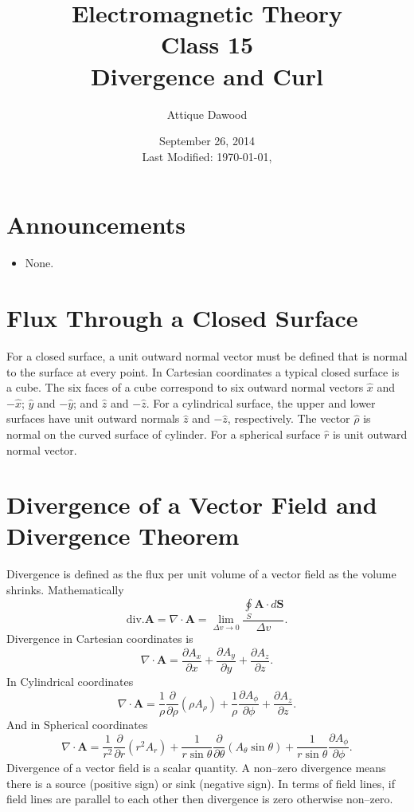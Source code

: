 \documentclass[12pt,a4paper]{article}
\title{Electromagnetic Theory\\Class 15\\Divergence and Curl}
\author{Attique Dawood}
\date{September 26, 2014\\[0.2cm] Last Modified: \today, \currenttime}
\begin{document}
\maketitle
\section{Announcements}
\begin{itemize}
\item None.
\end{itemize}
\section{Flux Through a Closed Surface}
For a closed surface, a unit outward normal vector must be defined that is normal to the surface at every point. In Cartesian coordinates a typical closed surface is a cube. The six faces of a cube correspond to six outward normal vectors $\hat x$ and $-\hat x$; $\hat y$ and $-\hat y$; and $\hat z$ and $-\hat z$. For a cylindrical surface, the upper and lower surfaces have unit outward normals $\hat z$ and $-\hat z$, respectively. The vector $\hat\rho$ is normal on the curved surface of cylinder. For a spherical surface $\hat r$ is unit outward normal vector.
\section{Divergence of a Vector Field and Divergence Theorem}
Divergence is defined as the flux per unit volume of a vector field as the volume shrinks. Mathematically
\begin{equation}
\mathrm{div. \textbf{A}}=\nabla\cdot\mathrm{\textbf{A}}=\lim_{\Delta v \to 0}\dfrac{\oint\limits_S\mathrm{\textbf{A}}\cdot d\mathrm{\textbf{S}}}{\Delta v}.
\end{equation}
Divergence in Cartesian coordinates is
\begin{equation}
\nabla\cdot\mathrm{\textbf{A}}=\dfrac{\partial A_x}{\partial x}+\dfrac{\partial A_y}{\partial y}+\dfrac{\partial A_z}{\partial z}.
\end{equation}
In Cylindrical coordinates
\begin{equation}
\nabla\cdot\mathrm{\textbf{A}}=\dfrac{1}{\rho}\dfrac{\partial}{\partial\rho}(\rho A_\rho)+\dfrac{1}{\rho}\dfrac{\partial A_\phi}{\partial\phi}+\dfrac{\partial A_z}{\partial z}.
\end{equation}
And in Spherical coordinates
\begin{equation}
\nabla\cdot\mathrm{\textbf{A}}=\dfrac{1}{r^2}\dfrac{\partial}{\partial r}(r^2 A_r)+\dfrac{1}{r\sin\theta}\dfrac{\partial}{\partial\theta}(A_\theta\sin\theta)+\dfrac{1}{r\sin\theta}\dfrac{\partial A_\phi}{\partial\phi}.
\end{equation}
Divergence of a vector field is a scalar quantity. A non--zero divergence means there is a source (positive sign) or sink (negative sign). In terms of field lines, if field lines are parallel to each other then divergence is zero otherwise non--zero.
\end{document}
